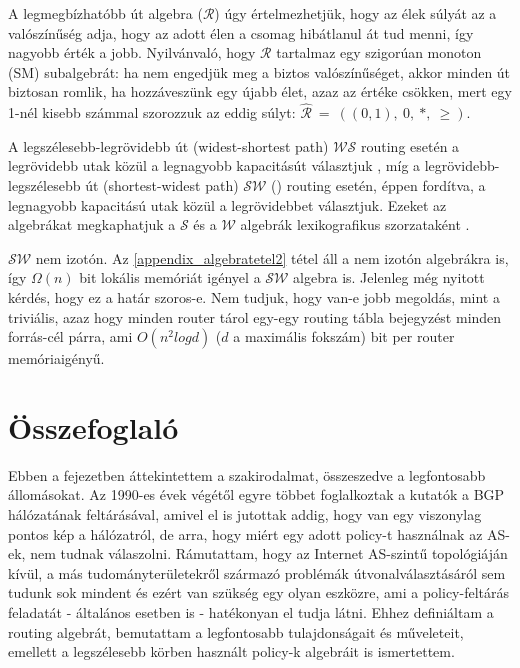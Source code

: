   A legmegbízhatóbb út algebra ($\mathcal{R}$) úgy értelmezhetjük, hogy az élek súlyát az a valószínűség adja, hogy az adott élen a csomag hibátlanul át tud menni, így nagyobb érték a jobb. Nyilvánvaló, hogy $\mathcal{R}$ tartalmaz egy szigorúan monoton (SM) subalgebrát: ha nem engedjük meg a biztos valószínűséget, akkor minden út biztosan romlik, ha hozzáveszünk egy újabb élet, azaz az értéke csökken, mert egy 1-nél kisebb számmal szorozzuk az eddig súlyt: $\hat{\mathcal{R}}~=~((0,1),~0,~*,~\geq)$.

  A legszélesebb-legrövidebb út (widest-shortest path) $\mathcal{WS}$ routing esetén a legrövidebb utak közül a legnagyobb kapacitásút választjuk \cite{Quality_of_service_based_routing_A_performance_perspective}, míg a legrövidebb-legszélesebb út (shortest-widest path) $\mathcal{SW}$ (\cite{Quality_of_service_routing_for_supporting_multimedia_applications, On_path_selection_for_traffic_with_bandwidth_guarantees}) routing esetén, éppen fordítva, a legnagyobb kapacitású utak közül a legrövidebbet választjuk. Ezeket az algebrákat megkaphatjuk a $\mathcal{S}$ és a $\mathcal{W}$ algebrák lexikografikus szorzataként \cite{Lexicographic_products_in_metarouting}. 
  \begin{note}
    $\mathcal{SW}$ nem izotón. Az \eqref{appendix_algebratetel2} tétel áll a nem izotón algebrákra is, így $\Omega(n)$ bit lokális memóriát igényel a $\mathcal{SW}$ algebra is. Jelenleg még nyitott kérdés, hogy ez a határ szoros-e. Nem tudjuk, hogy van-e jobb megoldás, mint a triviális, azaz hogy minden router tárol egy-egy routing tábla bejegyzést minden forrás-cél párra, ami $O(n^2 log d)$ ($d$ a maximális fokszám) bit per router memóriaigényű.
  \end{note}

  \section{Összefoglaló}\label{sect:section_osszefoglalo1}

  Ebben a fejezetben áttekintettem a szakirodalmat, összeszedve a legfontosabb állomásokat. Az 1990-es évek végétől egyre többet foglalkoztak a kutatók a BGP hálózatának feltárásával, amivel el is jutottak addig, hogy van egy viszonylag pontos kép a hálózatról, de arra, hogy miért egy adott policy-t használnak az AS-ek, nem tudnak válaszolni. Rámutattam, hogy az Internet AS-szintű topológiáján kívül, a más tudományterületekről származó problémák útvonalválasztásáról sem tudunk sok mindent és ezért van szükség egy olyan eszközre, ami a policy-feltárás feladatát - általános esetben is - hatékonyan el tudja látni. Ehhez definiáltam a routing algebrát, bemutattam a legfontosabb tulajdonságait és műveleteit, emellett a legszélesebb körben használt policy-k algebráit is ismertettem.